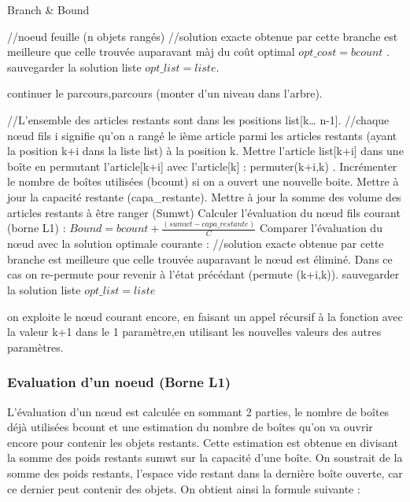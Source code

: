 \documentclass[12pt]{article}
\begin{document}
\begin{algorithm}[H]
    \caption{Branch \& Bound}
    \begin{algorithmic}
        \STATE //noeud feuille (n objets rangés)
            \STATE //solution exacte obtenue par cette branche est meilleure que celle trouvée auparavant
            \STATE màj du coût optimal $opt\_cost=bcount$ .
            \STATE sauvegarder la solution liste  $opt\_list=liste$. 
        
        \ELSE
            \STATE continuer le parcours,parcours (monter d’un niveau dans l’arbre).
       \ENDIF
        
    \ELSE

        \STATE //L’ensemble des articles restants sont dans les positions list[k… n-1].
        \STATE //chaque nœud fils i signifie qu’on a rangé le ième article parmi les articles restants (ayant la position k+i dans la liste list) à la position k.
            \STATE Mettre l’article list[k+i] dans une boîte en permutant l’article[k+i] avec l’article[k] : permuter(k+i,k) .
            \STATE Incrémenter le nombre de boîtes utilisées (bcount) si on a ouvert une nouvelle boite.
            \STATE Mettre à jour la capacité restante (capa\_restante).
            \STATE Mettre à jour la somme des volume des articles restants à être ranger (Sumwt)
            \STATE Calculer l’évaluation du nœud fils courant (borne L1) : $Bound=bcount+\frac{(sumwt-capa\_restante)}{C}$
            \STATE Comparer l’évaluation du nœud avec la solution optimale courante :
                \STATE //solution exacte obtenue par cette branche est meilleure que celle trouvée auparavant
                \STATE  le nœud est éliminé. Dans ce cas on re-permute pour revenir à l’état précédant (permute (k+i,k)). 
                \STATE sauvegarder la solution liste  $opt\_list=liste$ 
        
           \ELSE
                \STATE on exploite le nœud courant encore, en faisant un appel récursif à la fonction avec la valeur  k+1 dans le 1 paramètre,en utilisant les nouvelles valeurs des autres paramètres.
           \ENDIF


        \ENDFOR
    \ENDIF
    \end{algorithmic}
    \end{algorithm}
\subsubsection*{Evaluation d'un noeud (Borne L1)}
L’évaluation d’un nœud est calculée en sommant 2 parties, le nombre de boîtes déjà utilisées bcount et une estimation du nombre de boîtes qu’on va ouvrir encore pour contenir les objets restants. Cette estimation est obtenue en divisant la somme des poids restants sumwt sur la capacité d’une boîte. On soustrait de la somme des poids restants, l’espace vide 
restant dans la dernière boîte ouverte, car ce dernier peut contenir des objets. On obtient ainsi la formule suivante :  
\end{document}
